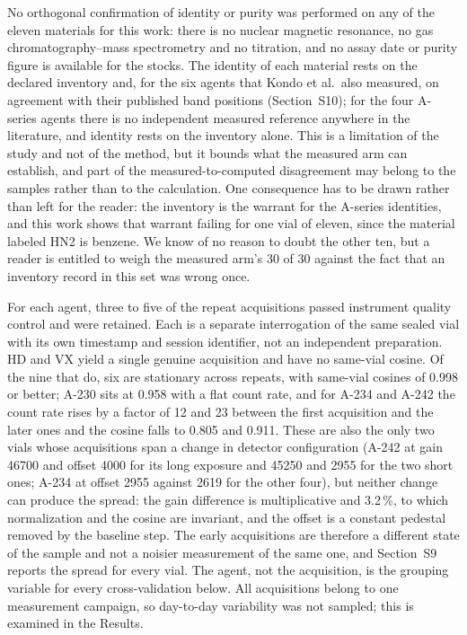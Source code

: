 \documentclass[review,12pt]{elsarticle}
\begin{document}
No orthogonal confirmation of identity or purity was performed on any of the eleven materials for this work: there is no nuclear magnetic resonance, no gas chromatography--mass spectrometry and no titration, and no assay date or purity figure is available for the stocks. The identity of each material rests on the declared inventory and, for the six agents that Kondo et al.\ also measured, on agreement with their published band positions (Section~S10); for the four A-series agents there is no independent measured reference anywhere in the literature, and identity rests on the inventory alone. This is a limitation of the study and not of the method, but it bounds what the measured arm can establish, and part of the measured-to-computed disagreement may belong to the samples rather than to the calculation. One consequence has to be drawn rather than left for the reader: the inventory is the warrant for the A-series identities, and this work shows that warrant failing for one vial of eleven, since the material labeled HN2 is benzene. We know of no reason to doubt the other ten, but a reader is entitled to weigh the measured arm's 30 of 30 against the fact that an inventory record in this set was wrong once.

For each agent, three to five of the repeat acquisitions passed instrument quality control and were retained. Each is a separate interrogation of the same sealed vial with its own timestamp and session identifier, not an independent preparation. HD and VX yield a single genuine acquisition and have no same-vial cosine. Of the nine that do, six are stationary across repeats, with same-vial cosines of 0.998 or better; A-230 sits at 0.958 with a flat count rate, and for A-234 and A-242 the count rate rises by a factor of 12 and 23 between the first acquisition and the later ones and the cosine falls to 0.805 and 0.911. These are also the only two vials whose acquisitions span a change in detector configuration (A-242 at gain 46700 and offset 4000 for its long exposure and 45250 and 2955 for the two short ones; A-234 at offset 2955 against 2619 for the other four), but neither change can produce the spread: the gain difference is multiplicative and 3.2\,\%, to which normalization and the cosine are invariant, and the offset is a constant pedestal removed by the baseline step. The early acquisitions are therefore a different state of the sample and not a noisier measurement of the same one, and Section~S9 reports the spread for every vial. The agent, not the acquisition, is the grouping variable for every cross-validation below. All acquisitions belong to one measurement campaign, so day-to-day variability was not sampled; this is examined in the Results.
\end{document}
